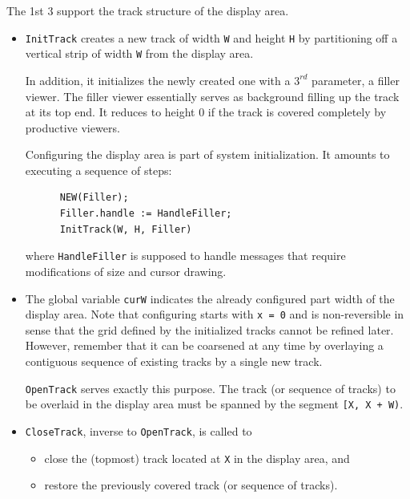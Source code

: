 The 1st 3 support the track structure of the display area.
\begin{itemize}
  \item \verb|InitTrack| creates a new track of width \verb|W| and height \verb|H|
    by partitioning off a vertical strip of width \verb|W| from the display area.

    In addition, it initializes the newly created one with a $3^{rd}$ parameter, a filler viewer.
    The filler viewer essentially serves as background filling up the track at its top end.
    It reduces to height 0 if the track is covered completely by productive viewers.

    Configuring the display area is part of system initialization.
    It amounts to executing a sequence of steps:
    \begin{verbatim}
      NEW(Filler);
      Filler.handle := HandleFiller;
      InitTrack(W, H, Filler)
    \end{verbatim}
    where \verb|HandleFiller| is supposed to handle messages
    that require modifications of size and cursor drawing.
 
  \item The global variable \verb|curW| indicates the already configured part width of the display area.
    Note that configuring starts with \verb|x = 0| and is non-reversible in sense that
    the grid defined by the initialized tracks cannot be refined later.  However, remember that
    it can be coarsened at any time by overlaying a contiguous sequence of existing tracks by a single new track.
 
    \verb|OpenTrack| serves exactly this purpose. The track (or sequence of tracks) to be overlaid
    in the display area must be spanned by the segment \verb|[X, X + W)|.
    
  \item \verb|CloseTrack|, inverse to \verb|OpenTrack|, is called to
    \begin{itemize}
      \item close the (topmost) track located at \verb|X| in the display area, and
      \item restore the previously covered track (or sequence of tracks).
    \end{itemize}
\end{itemize}

